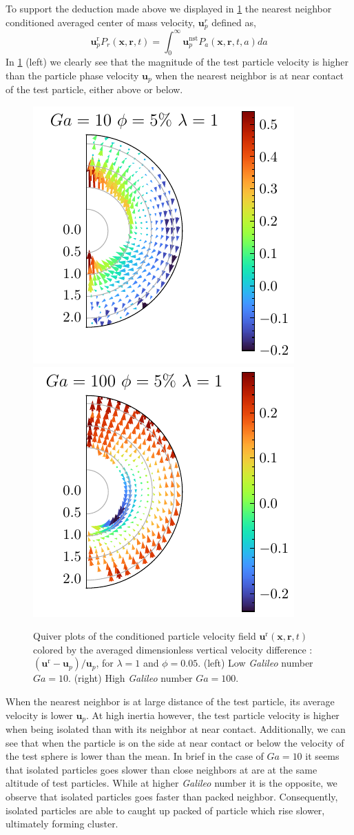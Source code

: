 To support the deduction made above we displayed in \ref{fig:unst_ga} the nearest neighbor conditioned averaged center of mass velocity, $\textbf{u}_p^r$ defined as,
\begin{equation*}
    \textbf{u}^\text{r}_p P_r(\textbf{x},\textbf{r},t)
    =\int_0^\infty \textbf{u}^\text{nst}_pP_a(\textbf{x},\textbf{r},t,a) da
\end{equation*}
In \ref{fig:unst_ga} (left) we clearly see that the magnitude of the test particle velocity is higher than the particle phase velocity $\textbf{u}_p$ when the nearest neighbor is at near contact of the test particle, either above or below.
\begin{figure}[h!]
    \centering
    \includegraphics[height=0.35\textwidth]{image/HOMOGENEOUS_NEW/Dist/U_l_1_Ga_10_PHI_5.pdf}
    \includegraphics[height=0.35\textwidth]{image/HOMOGENEOUS_NEW/Dist/U_l_1_Ga_100_PHI_5.pdf}
    \caption{
         Quiver plots of the conditioned particle velocity field $\textbf{u}^\text{r}(\textbf{x},\textbf{r},t)$ colored by the averaged dimensionless vertical velocity difference : $(\textbf{u}^\text{r} - \textbf{u}_p )/ \textbf{u}_p$, for $\lambda = 1$ and $\phi = 0.05$. 
         (left) Low \textit{Galileo} number $Ga = 10$.
        (right) High \textit{Galileo} number $Ga = 100$.
         }
    \label{fig:unst_ga}
\end{figure}
When the nearest neighbor is at large distance of the test particle, its average velocity is lower $\textbf{u}_p$. 
At high inertia however, the test particle velocity is higher when being isolated than with its neighbor at near contact. 
Additionally, we can see that when the particle is on the side at near contact or below the velocity of the test sphere is lower than the mean. 
In brief in the case of $Ga = 10$ it seems that isolated particles goes slower than close neighbors at are at the same altitude of test particles. 
While at higher \textit{Galileo} number it is the opposite, we observe that isolated particles  goes faster than packed neighbor. 
Consequently, isolated particles are able to caught up packed of particle which rise slower, ultimately forming cluster. 



